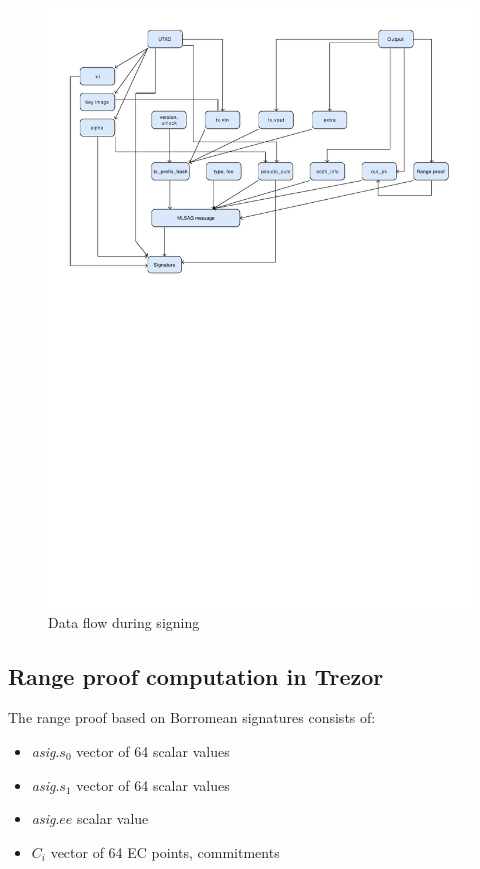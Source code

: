 \documentclass[]{article}
\begin{document}
\begin{figure}[H]
	\centering
	\includegraphics[width=1.\textwidth,trim={0 16cm 0 1cm},clip, angle=0]{img/data_flow.pdf}
	\caption{Data flow during signing} \label{fig:data_flow}
\end{figure}


\subsection{Range proof computation in Trezor}
The range proof based on Borromean signatures consists of:
\begin{itemize}
	\item \emph{asig}.$s_0$ vector of 64 scalar values
	\item \emph{asig}.$s_1$ vector of 64 scalar values
	\item \emph{asig}.$ee$ scalar value
	\item $C_i$ vector of 64 EC points, commitments
\end{itemize}
\end{document}
